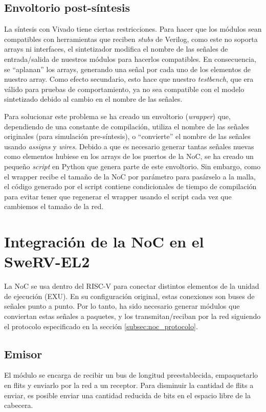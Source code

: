 \subsection{Envoltorio post-síntesis}
La síntesis con Vivado tiene ciertas restricciones. Para hacer que los módulos sean compatibles con herramientas que reciben \textit{stubs} de Verilog, como este no soporta arrays ni interfaces, el sintetizador modifica el nombre de las señales de entrada/salida de nuestros módulos para hacerlos compatibles. En consecuencia, se ``aplanan'' los arrays, generando una señal por cada uno de los elementos de nuestro array. Como efecto secundario, esto hace que nuestro \textit{testbench}, que era válido para pruebas de comportamiento, ya no sea compatible con el modelo sintetizado debido al cambio en el nombre de las señales.

Para solucionar este problema se ha creado un envoltorio (\textit{wrapper}) que, dependiendo de una constante de compilación, utiliza el nombre de las señales originales (para simulación pre-síntesis), o ``convierte'' el nombre de las señales usando \textit{assigns} y \textit{wires}. Debido a que es necesario generar tantas señales nuevas como elementos hubiese en los arrays de los puertos de la NoC, se ha creado un pequeño \textit{script} en Python que genera parte de este envoltorio. Sin embargo, como el wrapper recibe el tamaño de la NoC por parámetro para pasárselo a la malla, el código generado por el script contiene condicionales de tiempo de compilación para evitar tener que regenerar el wrapper usando el script cada vez que cambiemos el tamaño de la red.

\section{Integración de la NoC en el SweRV-EL2}
La NoC se usa dentro del RISC-V para conectar distintos elementos de la unidad de ejecución (EXU). En su configuración original, estas conexiones son buses de señales punto a punto. Por lo tanto, ha sido necesario generar módulos que conviertan estas señales a paquetes, y los transmitan/reciban por la red siguiendo el protocolo especificado en la sección \ref{subsec:noc_protocolo}.

\subsection{Emisor}
\label{subsec:emisor}
El módulo  se encarga de recibir un bus de longitud preestablecida, empaquetarlo en flits y enviarlo por la red a un receptor. Para disminuir la cantidad de flits a enviar, es posible enviar una cantidad reducida de bits en el espacio libre de la cabecera.

